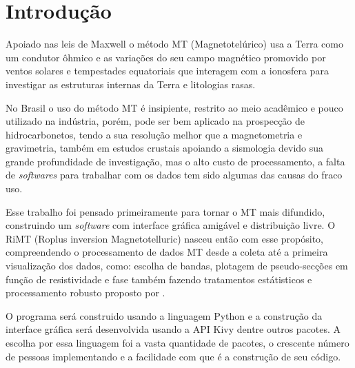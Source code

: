 

\chapter{Introdução}
    \label{cap-introducao}
    
	Apoiado nas leis de Maxwell o método MT (Magnetotelúrico) usa a Terra como 
	um condutor ôhmico e as variações do seu campo 
	magnético promovido por ventos solares \cite{parkinson93} e tempestades equatoriais 
	que interagem com a ionosfera para investigar as 
	estruturas internas da Terra e litologias rasas. 
	
	
	No Brasil o uso do método MT é insipiente, restrito ao meio acadêmico e pouco
	utilizado na indústria, porém, pode ser bem aplicado na prospecção de 
	hidrocarbonetos, tendo a sua resolução melhor que a magnetometria
	e gravimetria, também em estudos crustais
	apoiando a sismologia devido sua grande profundidade de investigação, mas o 
	alto custo de processamento, a falta de \textit{softwares} para trabalhar com os 
	dados tem sido algumas das causas do fraco uso.
	
	
	Esse trabalho foi pensado primeiramente para tornar o MT mais difundido, 
	construindo um \textit{software} com interface gráfica amigável e 
	distribuição livre. O RiMT (Roplus inversion Magnetotelluric) nasceu 
	então com esse propósito, compreendendo o processamento de dados
	MT desde a coleta até a primeira visualização dos dados, como: escolha 
	de bandas, plotagem de pseudo-secções em função de resistividade e fase 
	também fazendo tratamentos estátisticos e processamento robusto 
	proposto por \citeauthor{egbert97} \citeyearpar{egbert97}.
	
	
	O programa será construido usando a linguagem Python \cite{python36} 
	e a construção da interface gráfica será desenvolvida usando a API
	Kivy \cite{kivy110} dentre outros pacotes. A escolha por essa linguagem foi a vasta quantidade de pacotes,  o crescente 
	número de pessoas implementando e a facilidade com que é a construção de seu
	código.



